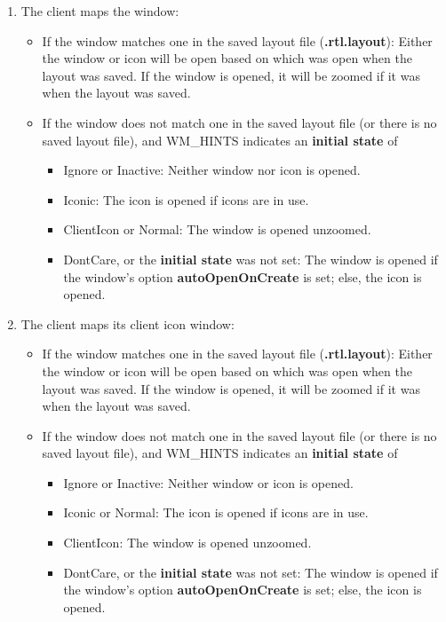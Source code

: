 \begin{enumerate}
\item 
The client maps the window:
\begin{itemize}
\item If the window matches one in the saved layout file ({\bf .rtl.layout}):
Either the window or icon will be open based on which was open when the
layout was saved.  If the window is opened, it will be zoomed if it
was when the layout was saved.

\item 
If the window does not match one in the saved layout file (or there
is no saved layout file), and {\sc WM\_HINTS} indicates an {\bf initial state}
of

\begin{itemize}
\item Ignore or Inactive: Neither window nor icon is opened.

\item Iconic: The icon is opened if icons are in use.

\item ClientIcon or Normal: The window is opened unzoomed.

\item DontCare, or the {\bf initial state} was not set: The window is opened if
the window's option {\bf autoOpenOnCreate} is set; else, the icon is
opened.
\end{itemize}

\end{itemize}


\item 
The client maps its client icon window:
\begin{itemize}
\item If the window matches one in the saved layout file ({\bf .rtl.layout}):
Either the window or icon will be open based on which was open when the
layout was saved.  If the window is opened, it will be zoomed if it
was when the layout was saved.

\item 
If the window does not match one in the saved layout file (or there
is no saved layout file), and {\sc WM\_HINTS} indicates an {\bf initial state}
of

\begin{itemize}
\item Ignore or Inactive: Neither window or icon is opened.

\item Iconic or Normal: The icon is opened if icons are in use.

\item ClientIcon: The window is opened unzoomed.

\item DontCare, or the {\bf initial state} was not set: The window is opened if
the window's option {\bf autoOpenOnCreate} is set; else, the icon is
opened.
\end{itemize}

\end{itemize}


\end{enumerate}

